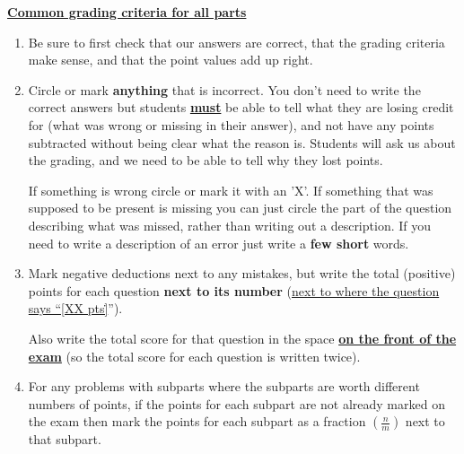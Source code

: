 \documentclass[11pt,fleqn]{article}
\begin{document}

  {

    \begin{info}{\textbf{\underline{\Large Common grading criteria for all
                 parts}}}

      \vspace*{-10mm}

      \enlargethispage{6mm}

      \setlength{\leftmarginii}{5mm}

      \begin{enumerate}

        \addtolength{\itemsep}{.5mm}

        \item Be sure to first check that our answers are correct, that the
              grading criteria make sense, and that the point values add up
              right.

        \item Circle or mark \textbf{anything} that is incorrect.  You don't
              need to write the correct answers but students
              \textbf{\underline{must}} be able to tell what they are losing
              credit for (what was wrong or missing in their answer), and not
              have any points subtracted without being clear what the reason
              is.  Students will ask us about the grading, and we need to be
              able to tell why they lost points.

              If something is wrong circle or mark it with an 'X'.  If
              something that was supposed to be present is missing you can
              just circle the part of the question describing what was missed,
              rather than writing out a description.  If you need to write a
              description of an error just write a \textbf{few short} words.

        \item Mark negative deductions next to any mistakes, but write the
              total (positive) points for each question \textbf{next to its
              number} (\underline{next to where the question says ``[XX
              pts\.]}'').

              Also write the total score for that question in the space
              \textbf{\underline{on the front of the exam}} (so the total
              score for each question is written twice).

        \item For any problems with subparts where the subparts are worth
              different numbers of points, if the points for each subpart
              are not already marked on the exam then mark the points for each
              subpart as a fraction $\left(\frac{n}{m}\right)$ next to that
              subpart.


\end{enumerate}
\end{info}}
\end{document}
